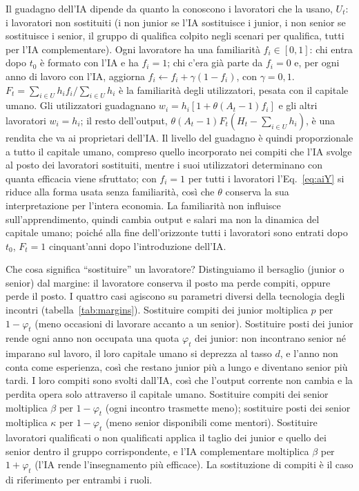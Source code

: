 \documentclass[preprint,12pt,authoryear]{elsarticle}
\begin{document}
Il guadagno dell'IA dipende da quanto la conoscono i lavoratori che la usano, $U_t$: i lavoratori non sostituiti (i non junior se l'IA sostituisce i junior, i non senior se sostituisce i senior, il gruppo di qualifica colpito negli scenari per qualifica, tutti per l'IA complementare). Ogni lavoratore ha una familiarità $f_i\in[0,1]$: chi entra dopo $t_0$ è formato con l'IA e ha $f_i=1$; chi c'era già parte da $f_i=0$ e, per ogni anno di lavoro con l'IA, aggiorna $f_i \leftarrow f_i+\gamma(1-f_i)$, con $\gamma=0{,}1$. $F_t=\sum_{i\in U}h_if_i/\sum_{i\in U}h_i$ è la familiarità degli utilizzatori, pesata con il capitale umano. Gli utilizzatori guadagnano $w_i=h_i[1+\theta(A_t-1)f_i]$ e gli altri lavoratori $w_i=h_i$; il resto dell'output, $\theta(A_t-1)F_t(H_t-\sum_{i\in U}h_i)$, è una rendita che va ai proprietari dell'IA. Il livello del guadagno è quindi proporzionale a tutto il capitale umano, compreso quello incorporato nei compiti che l'IA svolge al posto dei lavoratori sostituiti, mentre i suoi utilizzatori determinano con quanta efficacia viene sfruttato; con $f_i=1$ per tutti i lavoratori l'Eq.~\eqref{eq:aiY} si riduce alla forma usata senza familiarità, così che $\theta$ conserva la sua interpretazione per l'intera economia. La familiarità non influisce sull'apprendimento, quindi cambia output e salari ma non la dinamica del capitale umano; poiché alla fine dell'orizzonte tutti i lavoratori sono entrati dopo $t_0$, $F_t=1$ cinquant'anni dopo l'introduzione dell'IA.

Che cosa significa ``sostituire'' un lavoratore? Distinguiamo il bersaglio (junior o senior) dal margine: il lavoratore conserva il posto ma perde compiti, oppure perde il posto. I quattro casi agiscono su parametri diversi della tecnologia degli incontri (tabella~\ref{tab:margins}). Sostituire compiti dei junior moltiplica $p$ per $1-\varphi_t$ (meno occasioni di lavorare accanto a un senior). Sostituire posti dei junior rende ogni anno non occupata una quota $\varphi_t$ dei junior: non incontrano senior né imparano sul lavoro, il loro capitale umano si deprezza al tasso $d$, e l'anno non conta come esperienza, così che restano junior più a lungo e diventano senior più tardi. I loro compiti sono svolti dall'IA, così che l'output corrente non cambia e la perdita opera solo attraverso il capitale umano. Sostituire compiti dei senior moltiplica $\beta$ per $1-\varphi_t$ (ogni incontro trasmette meno); sostituire posti dei senior moltiplica $\kappa$ per $1-\varphi_t$ (meno senior disponibili come mentori). Sostituire lavoratori qualificati o non qualificati applica il taglio dei junior e quello dei senior dentro il gruppo corrispondente, e l'IA complementare moltiplica $\beta$ per $1+\varphi_t$ (l'IA rende l'insegnamento più efficace). La sostituzione di compiti è il caso di riferimento per entrambi i ruoli.
\end{document}
